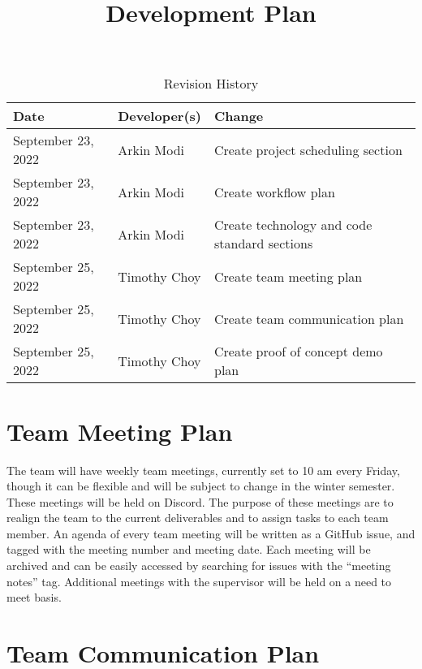 \documentclass{article}
\title{Development Plan\\\progname}
\author{\authname}
\date{}
\begin{document}
\begin{table}[hp]
\caption{Revision History} \label{TblRevisionHistory}
\begin{tabularx}{\textwidth}{llX}
\toprule
\textbf{Date} & \textbf{Developer(s)} & \textbf{Change}\\
\midrule
September 23, 2022 & Arkin Modi & Create project scheduling section\\
September 23, 2022 & Arkin Modi & Create workflow plan\\
September 23, 2022 & Arkin Modi & Create technology and code standard sections\\
September 25, 2022 & Timothy Choy & Create team meeting plan\\
September 25, 2022 & Timothy Choy & Create team communication plan\\
September 25, 2022 & Timothy Choy & Create proof of concept demo plan\\
\bottomrule
\end{tabularx}
\end{table}

\newpage

\maketitle


\section{Team Meeting Plan}

The team will have weekly team meetings, currently set to 10 am every Friday, though it can be 
flexible and will be subject to change in the winter semester. These meetings will be held on 
Discord. The purpose of these meetings are to realign the team to the current deliverables and to 
assign tasks to each team member. An agenda of every team meeting will be written as a GitHub 
issue, and tagged with the meeting number and meeting date. Each meeting will be archived and can 
be easily accessed by searching for issues with the ``meeting notes'' tag. Additional meetings with 
the supervisor will be held on a need to meet basis.

\section{Team Communication Plan}
\end{document}
